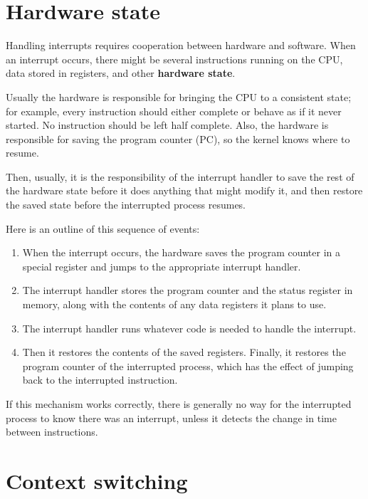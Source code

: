 \documentclass[12pt]{book}
\begin{document}
\section{Hardware state}

Handling interrupts requires cooperation between hardware and
software.  When an interrupt occurs, there might be several
instructions running on the CPU, data stored in registers, and
other {\bf hardware state}.

Usually the hardware is responsible for bringing the CPU
to a consistent state; for example, every instruction should either
complete or behave as if it never started.  No instruction should
be left half complete.  Also, the hardware is responsible for
saving the program counter (PC), so the kernel knows where to
resume.

Then, usually, it is the responsibility of the interrupt handler
to save the rest of the hardware state before it does anything that
might modify it, and then restore the saved state before the interrupted
process resumes.

Here is an outline of this sequence of events:

\begin{enumerate}

\item When the interrupt occurs, the hardware saves the program
counter in a special register and jumps to the appropriate interrupt
handler.

\item The interrupt handler stores the program counter and the
status register in memory, along with the contents of any data
registers it plans to use.

\item The interrupt handler runs whatever code is needed to handle
the interrupt.

\item Then it restores the contents of the saved registers.  Finally,
it restores the program counter of the interrupted process, which
has the effect of jumping back to the interrupted instruction.

\end{enumerate}

If this mechanism works correctly, there is generally no way for
the interrupted process to know there was an interrupt, unless
it detects the change in time between instructions.


\section{Context switching}
\end{document}

